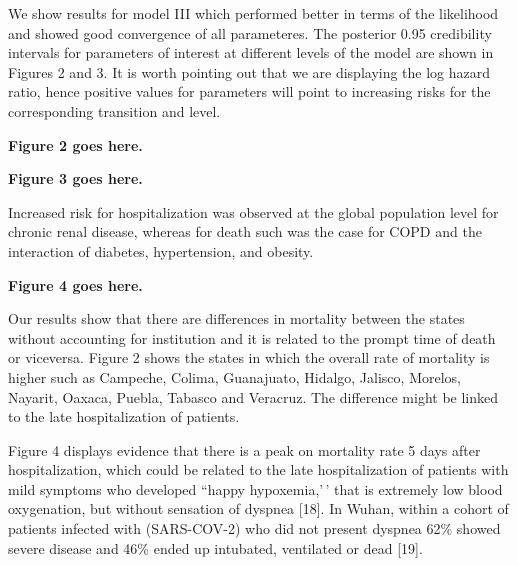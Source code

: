 \documentclass[10pt,letterpaper]{article}
\begin{document}
We show results for model III which performed better in terms of the
likelihood and showed good convergence of all parameteres. The posterior
0.95 credibility intervals for parameters of interest at different
levels of the model are shown in Figures 2 and 3. It is worth pointing
out that we are displaying the log hazard ratio, hence positive values
for parameters will point to increasing risks for the corresponding
transition and level.

\vspace{5mm}

\begin{center}
\textbf{Figure 2 goes here.}
\end{center}

\vspace{5mm}

\begin{center}
\textbf{Figure 3 goes here.}
\end{center}

\vspace{5mm}

Increased risk for hospitalization was observed at the global population
level for chronic renal disease, whereas for death such was the case for
COPD and the interaction of diabetes, hypertension, and obesity.

\vspace{5mm}

\begin{center}
\textbf{Figure 4 goes here.}
\end{center}

\vspace{5mm}

Our results show that there are differences in mortality between the
states without accounting for institution and it is related to the
prompt time of death or viceversa. Figure 2 shows the states in which
the overall rate of mortality is higher such as Campeche, Colima,
Guanajuato, Hidalgo, Jalisco, Morelos, Nayarit, Oaxaca, Puebla, Tabasco
and Veracruz. The difference might be linked to the late hospitalization
of patients.

Figure 4 displays evidence that there is a peak on mortality rate 5 days
after hospitalization, which could be related to the late
hospitalization of patients with mild symptoms who developed ``happy
hypoxemia,'\,' that is extremely low blood oxygenation, but without
sensation of dyspnea {[}18{]}. In Wuhan, within a cohort of patients
infected with (SARS-COV-2) who did not present dyspnea 62\% showed
severe disease and 46\% ended up intubated, ventilated or dead {[}19{]}.
\end{document}
